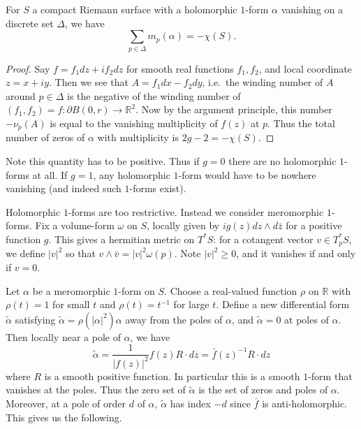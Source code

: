\begin{proposition}
    For \(S\) a compact Riemann surface with a holomorphic \(1\)-form
    \(\alpha\) vanishing on a discrete set \(\Delta\), we have
    \[
        \sum_{p\in \Delta}m_p(\alpha) = -\chi(S).
    \]
    \begin{proof}
        Say \(f=f_1dz+if_2dz\) for smooth real functions \(f_1,f_2\), and local
        coordinate \(z=x+iy\). Then we see that \(A=f_1dx-f_2dy\), i.e.\ the
        winding number of \(A\) around \(p\in \Delta\) is the negative of the
        winding number of \((f_1,f_2)=f:\partial B(0,r)\to \mathbb{R}^2\). Now
        by the argument principle, this number \(-\nu_p(A)\)
         is equal to the vanishing multiplicity of \(f(z)\) at
        \(p\).  Thus the total number of zeros of \(\alpha\) with multiplicity
        is \(2g-2=-\chi(S)\).
    \end{proof}
\end{proposition}

Note this quantity has to be positive. Thus if \(g=0\) there are no holomorphic
\(1\)-forms at all. If \(g=1\), any holomorphic \(1\)-form would have to be
nowhere vanishing (and indeed such \(1\)-forms exist).

Holomorphic \(1\)-forms are too restrictive. Instead we consider meromorphic
\(1\)-forms. Fix a volume-form \(\omega\) on \(S\), locally given by
\(ig(z)dz\wedge d\bar z\) for a positive function \(g\). This gives a hermitian
metric on \(T^\ast S\): for a cotangent vector \(v\in T_p^\ast S\), we
define \(|v|^2\) so that \(v\wedge \bar v = |v|^2 \omega(p)\).  Note \(|v|^2\geq
0\), and it vanishes if and only if \(v=0\).

Let \(\alpha\) be a meromorphic \(1\)-form on \(S\). Choose a real-valued
function \(\rho\) on \(\mathbb{R}\) with \(\rho(t)=1\) for small \(t\) and
\(\rho(t)=t^{-1}\) for large \(t\). Define a new differential form
\(\tilde\alpha\) satisfying \(\tilde\alpha = \rho(|\alpha|^2)\alpha\) away from
the poles of \(\alpha\), and \(\tilde\alpha = 0\) at poles of \(\alpha\).
Then locally near a pole of \(\alpha\), we have
\[
    \tilde\alpha = \frac{1}{|f(z)|^2}f(z)R\cdot dz = \bar f(z)^{-1} R\cdot dz
\]
where \(R\) is a smooth positive function. In particular this is a smooth
\(1\)-form that vanishes at the poles. Thus the zero set of \(\tilde\alpha\) is
the set of zeros and poles of \(\alpha\). Moreover, at a pole of order \(d\) of
\(\alpha\), \(\tilde\alpha\) has index \(-d\) since \(\bar f\) is
anti-holomorphic. This gives us the following.

